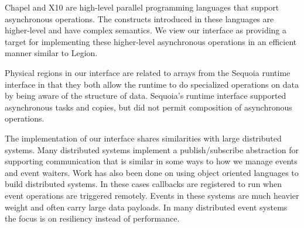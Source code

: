 Chapel\cite{Chamberlain:Chapel} and X10\cite{X1005} are high-level parallel
programming languages that support asynchronous operations.  The constructs
introduced in these languages are higher-level and have complex 
semantics.  We view our interface as providing a target
for implementing these higher-level asynchronous operations in an efficient
manner similar to Legion\cite{Legion12}.

Physical regions in our interface are related to
arrays from the Sequoia runtime interface\cite{Houston08} in that they
both allow the runtime to do specialized operations on data by being
aware of the structure of data.  Sequoia's runtime interface supported
asynchronous tasks and copies, but did not permit composition of
asynchronous operations.

The implementation of our interface shares similarities with large
distributed systems.  Many distributed systems implement a publish/subscribe
abstraction for supporting communication that is similar in some ways to how
we manage events and event waiters\cite{Aguilera99,Carzaniga01}.  Work has
also been done on using object oriented languages to build 
distributed systems\cite{Eugster01,Harrison97,Chang91}.  In these cases
callbacks are registered to run when event operations are triggered
remotely.  Events in these systems are much heavier weight
and often carry large data payloads.  In many distributed event systems
the focus is on resiliency instead of performance\cite{Ostrowski09}.
